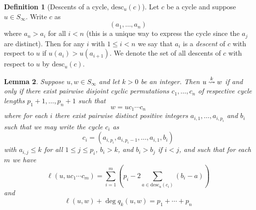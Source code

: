 \documentclass{amsart}
\newtheorem{lemma}{Lemma}[section]
\theoremstyle{definition}
\newtheorem{definition}[lemma]{Definition}
\theoremstyle{remark}
\numberwithin{equation}{section}
\newcommand{\xrightsquigarrow}[2][]{%
	\mathrel{\mathop{\rightsquigarrow}\limits^{\scriptstyle #2}%
	\ifx\hfuzz#1\hfuzz\else_{\scriptstyle #1}\fi}%
}
\newcommand{\tom}[1]{\ensuremath{\xrightsquigarrow{#1}}}
\begin{document}
\newcommand{\ntom}[1]{\centernot{\tom{#1}}}

\newcommand{\desc}{\mathrm{desc}}

\begin{definition}[Descents of a cycle, $\desc_u(c)$]
Let $c$ be a cycle and suppose $u\in S_\infty$. Write $c$ as
$$(a_1,\ldots,a_n)$$
where $a_n>a_i$ for all $i<n$ (this is a unique way to express the cycle since the $a_j$ are distinct). Then for any $i$ with $1\leq i<n$ we say that $a_i$ is a \emph{descent} of $c$ with respect to $u$ if $u(a_i)>u(a_{i+1})$. We denote the set of all descents of $c$ with respect to $u$ by $\desc_u(c)$.
\end{definition}

\begin{lemma} \label{lemma:piericycle}
Suppose $u,w\in S_\infty$ and let $k>0$ be an integer. Then $u\tom{k} w$ if and only if there exist pairwise disjoint cyclic permutations $c_1,\ldots,c_n$ of respective cycle lengths $p_1+1,\ldots,p_n+1$ such that
$$w=uc_1\cdots c_n$$
where for each $i$ there exist pairwise distinct positive integers $a_{i,1},\ldots,a_{i,p_i}$ and $b_i$ such that we may write the cycle $c_i$ as
$$c_i=(a_{i,p_i},a_{i,p_i-1},\ldots, a_{i,1},b_i)$$
with $a_{i,j}\leq k$ for all $1\leq j\leq p_i$, $b_i>k$, and $b_i>b_j$ if $i<j$, and such that for each $m$ we have
$$\ell(u,uc_1\cdots c_m) = \sum_{i=1}^m \left(p_i - 2\sum_{a\in \desc_u(c_i)}(b_i-a)\right)$$
and
$$\ell(u,w)+\deg q_k(u,w)=p_1+\cdots+p_n$$
\end{lemma}
\end{document}
